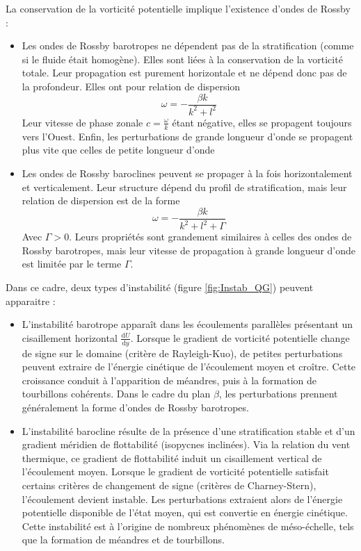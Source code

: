 La conservation de la vorticité potentielle implique l'existence d'ondes de Rossby  : 
\begin{itemize}
	\item Les ondes de Rossby barotropes ne dépendent pas de la stratification (comme si le fluide était homogène). Elles sont liées à la conservation de la vorticité totale. Leur propagation est purement horizontale et ne dépend donc pas de la profondeur. Elles ont pour relation de dispersion
	\begin{equation}
		\omega = -\frac{\beta k}{k^2+l^2}
	\end{equation}
	Leur vitesse de phase zonale $c = \frac{\omega}{k}$ étant négative, elles se propagent toujours vers l'Ouest. Enfin, les perturbations de grande longueur d'onde se propagent plus vite que celles de petite longueur d'onde
	\item Les ondes de Rossby baroclines peuvent se propager à la fois horizontalement et verticalement. Leur structure dépend du profil de stratification, mais leur relation de dispersion est de la forme 
	\begin{equation}
		\omega  = -\frac{\beta k }{k^2 + l^2 + \Gamma}
	\end{equation}
	Avec $\Gamma > 0$. Leurs propriétés sont grandement similaires à celles des ondes de Rossby barotropes, mais leur vitesse de propagation à grande longueur d'onde est limitée par le terme $\Gamma$.
\end{itemize}
Dans ce cadre, deux types d'instabilité (figure \ref{fig:Instab_QG}) peuvent apparaitre : 
\begin{itemize}
	\item L'instabilité barotrope apparaît dans les écoulements parallèles présentant un cisaillement horizontal $\frac{\mathrm{d}U}{\mathrm{d}y}$. Lorsque le gradient de vorticité potentielle change de signe sur le domaine (critère de Rayleigh-Kuo), de petites perturbations peuvent extraire de l'énergie cinétique de l'écoulement moyen et croître. Cette croissance conduit à l'apparition de méandres, puis à la formation de tourbillons cohérents. Dans le cadre du plan $\beta$, les perturbations prennent généralement la forme d'ondes de Rossby barotropes.
	\item L'instabilité barocline résulte de la présence d'une stratification stable et d'un gradient méridien de flottabilité (isopycnes inclinées). Via la relation du vent thermique, ce gradient de flottabilité induit un cisaillement vertical de l'écoulement moyen. Lorsque le gradient de vorticité potentielle satisfait certains critères de changement de signe (critères de Charney-Stern), l'écoulement devient instable. Les perturbations extraient alors de l'énergie potentielle disponible de l'état moyen, qui est convertie en énergie cinétique. Cette instabilité est à l'origine de nombreux phénomènes de méso-échelle, tels que la formation de méandres et de tourbillons.
\end{itemize}

